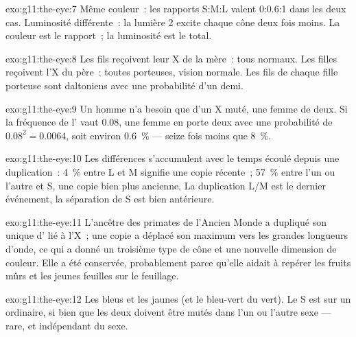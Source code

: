 \begin{solution}{exo:g11:the-eye:7}
Même couleur~: les rapports S:M:L valent 0:0.6:1 dans les deux cas.
Luminosité différente~: la lumière 2 excite chaque cône deux fois
moins. La couleur est le rapport~; la luminosité est le total.
\end{solution}

\begin{solution}{exo:g11:the-eye:8}
Les fils reçoivent leur X de la mère~: tous normaux. Les filles
reçoivent l'X du père~: toutes porteuses, vision normale. Les fils de
chaque fille porteuse sont daltoniens avec une probabilité d'un demi.
\end{solution}

\begin{solution}{exo:g11:the-eye:9}
Un homme n'a besoin que d'un X muté, une femme de deux. Si la fréquence
de l' vaut 0.08, une femme en porte deux avec une probabilité de
$0.08^2 = 0.0064$, soit environ 0.6~\% --- seize fois moins que 8~\%.
\end{solution}

\begin{solution}{exo:g11:the-eye:10}
Les différences s'accumulent avec le temps écoulé depuis une
duplication~: 4~\% entre L et M signifie une copie récente~; 57~\%
entre l'un ou l'autre et S, une copie bien plus ancienne. La
duplication L/M est le dernier événement, la séparation de S est bien
antérieure.
\end{solution}

\begin{solution}{exo:g11:the-eye:11}
L'ancêtre des primates de l'Ancien Monde a dupliqué son unique 
d' lié à l'X~; une copie a déplacé son maximum vers les grandes
longueurs d'onde, ce qui a donné un troisième type de cône et une
nouvelle dimension de couleur. Elle a été conservée, probablement parce
qu'elle aidait à repérer les fruits mûrs et les jeunes feuilles sur le
feuillage.
\end{solution}

\begin{solution}{exo:g11:the-eye:12}
Les bleus et les jaunes (et le bleu-vert du vert). Le  S est sur un
 ordinaire, si bien que les deux  doivent être mutés
dans l'un ou l'autre sexe --- rare, et indépendant du sexe.
\end{solution}

